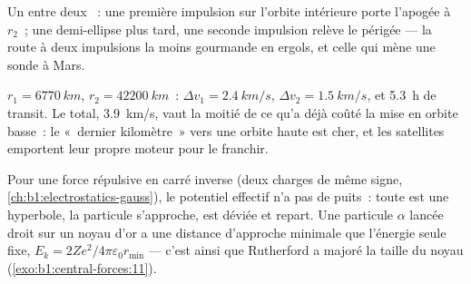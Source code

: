 \begin{omfigure}

{\small Un  entre deux ~: une
première impulsion sur l'orbite intérieure porte l'apogée à $r_2$~; une
demi-ellipse plus tard, une seconde impulsion relève le périgée --- la
route à deux impulsions la moins gourmande en ergols, et celle qui mène
une sonde à Mars.}
\end{omfigure}

\begin{example}\label{ex:b1:central-forces:leogeo}
$r_1 = \qty{6770}{km}$, $r_2 = \qty{42200}{km}$~: $\Delta v_1 = \qty{2.4}{km/s}$,
$\Delta v_2 = \qty{1.5}{km/s}$, et \qty{5.3}{h} de transit. Le total,
\qty{3.9}{km/s}, vaut la moitié de ce qu'a déjà coûté la mise en orbite
basse~: le «~dernier kilomètre~» vers une orbite haute est cher, et les
satellites emportent leur propre moteur pour le franchir.
\end{example}

\begin{remark}\label{rem:b1:central-forces:rutherford}
Pour une force répulsive en carré inverse (deux charges de même signe,
\cref{ch:b1:electrostatics-gauss}), le potentiel effectif n'a pas de
puits~: toute  est une hyperbole, la particule s'approche,
est déviée et repart. Une particule $\alpha$ lancée droit sur un noyau
d'or a une distance d'approche minimale que l'énergie seule fixe, $E_k =
2Ze^2/4\pi\varepsilon_0 r_{\min}$ --- c'est ainsi que Rutherford a
majoré la taille du noyau (\cref{exo:b1:central-forces:11}).
\end{remark}

